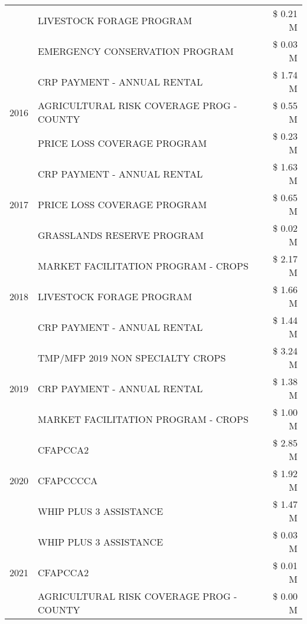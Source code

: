 \begin{tabular}{llr}
 & LIVESTOCK FORAGE PROGRAM & \$ 0.21 M \\
 & EMERGENCY CONSERVATION PROGRAM & \$ 0.03 M \\
\cline{1-3}
\multirow[t]{3}{*}{2016} & CRP PAYMENT - ANNUAL RENTAL & \$ 1.74 M \\
 & AGRICULTURAL RISK COVERAGE PROG - COUNTY & \$ 0.55 M \\
 & PRICE LOSS COVERAGE PROGRAM & \$ 0.23 M \\
\cline{1-3}
\multirow[t]{3}{*}{2017} & CRP PAYMENT - ANNUAL RENTAL & \$ 1.63 M \\
 & PRICE LOSS COVERAGE PROGRAM & \$ 0.65 M \\
 & GRASSLANDS RESERVE PROGRAM & \$ 0.02 M \\
\cline{1-3}
\multirow[t]{3}{*}{2018} & MARKET FACILITATION PROGRAM - CROPS & \$ 2.17 M \\
 & LIVESTOCK FORAGE PROGRAM & \$ 1.66 M \\
 & CRP PAYMENT - ANNUAL RENTAL & \$ 1.44 M \\
\cline{1-3}
\multirow[t]{3}{*}{2019} & TMP/MFP 2019 NON SPECIALTY CROPS & \$ 3.24 M \\
 & CRP PAYMENT - ANNUAL RENTAL & \$ 1.38 M \\
 & MARKET FACILITATION PROGRAM - CROPS & \$ 1.00 M \\
\cline{1-3}
\multirow[t]{3}{*}{2020} & CFAPCCA2 & \$ 2.85 M \\
 & CFAPCCCCA & \$ 1.92 M \\
 & WHIP PLUS 3 ASSISTANCE & \$ 1.47 M \\
\cline{1-3}
\multirow[t]{3}{*}{2021} & WHIP PLUS 3 ASSISTANCE & \$ 0.03 M \\
 & CFAPCCA2 & \$ 0.01 M \\
 & AGRICULTURAL RISK COVERAGE PROG - COUNTY & \$ 0.00 M \\
\cline{1-3}
\bottomrule
\end{tabular}
